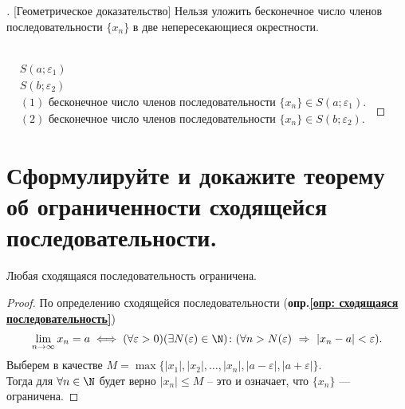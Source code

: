 \begin{proof}[][Геометрическое доказательство]
  Нельзя уложить бесконечное число членов последовательности $\{x_{n}\}$ в две непересекающиеся окрестности.\\[2ex]
  \\[2ex]
  $\begin{aligned}
    &S(a; \varepsilon_1)\\
    &S(b; \varepsilon_2)
  \end{aligned}$ \quad $\begin{aligned}
    &(1) \text{ бесконечное число членов последовательности } {\{x_n\}} \in S(a; \varepsilon_1). \\
    &(2) \text{ бесконечное число членов последовательности } {\{x_n\}} \in S(b; \varepsilon_2).
  \end{aligned}$
\end{proof}

\section{Сформулируйте и докажите теорему об ограниченности сходящейся последовательности.}

\begin{theorem}
    Любая сходящаяся последовательность ограничена. 
  \end{theorem}
  
\begin{proof}
    По определению сходящейся последовательности (\textbf{опр.\ref{опр: сходящаяся последовательность}})
    \vspace{-2pt}
    \begin{gather*}
         \lim_{n \to \infty} x_n = a \iff (\forall \varepsilon > 0)(\exists N(\varepsilon)\in \N)\colon (\forall n > N(\varepsilon)\ \Rightarrow\ |x_{n} - a| < \varepsilon).
    \end{gather*}
    Выберем в качестве $M = \max \{|x_{1}|, |x_2|, \ldots, |x_n|, |a - \varepsilon|, |a + \varepsilon|\}$. \\
    Тогда для $\forall n \in \N$ будет верно $|x_{n}| \le M$ -- это и означает, что $\{x_{n}\}$ --- ограничена.
\end{proof}
\newpage
